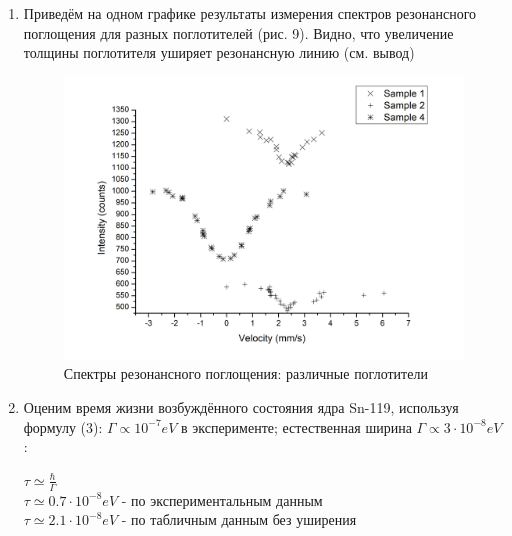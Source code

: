\documentclass[a4paper]{article}
\begin{document}
\begin{enumerate}
\item Приведём на одном графике результаты измерения спектров резонансного поглощения для разных поглотителей (рис. 9). Видно, что увеличение толщины поглотителя уширяет резонансную линию (см. вывод)

\begin{figure}[h]
    \centering
    \includegraphics[width=15cm]{Graph5}
    \caption{Спектры резонансного поглощения: различные поглотители}
    \label{fig:vac}
\end{figure} \clearpage

\item Оценим время жизни возбуждённого состояния ядра Sn-119, используя формулу (3): $\Gamma \propto 10^{-7} eV$ в эксперименте; естественная ширина $\Gamma \propto 3 \cdot 10^{-8} eV$:
\begin{center}
    $\tau \simeq \frac{\hbar}{\Gamma}$ \\
    $\tau \simeq 0.7 \cdot 10^{-8} eV$ - по экспериментальным данным\\
    $\tau \simeq 2.1 \cdot 10^{-8} eV$  - по табличным данным без уширения\\
\end{center}

\end{enumerate}
\end{document}
